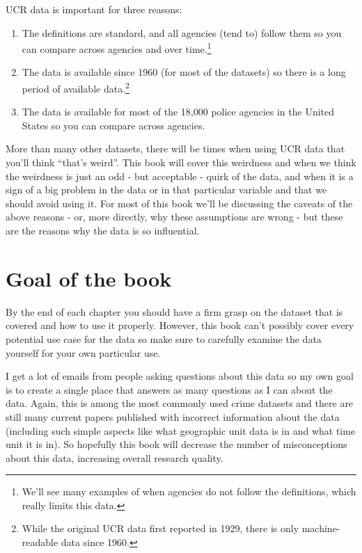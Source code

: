 \documentclass[
]{krantz}
\providecommand{\tightlist}{%
  \setlength{\itemsep}{0pt}\setlength{\parskip}{0pt}}
\begin{document}
UCR data is important for three reasons:

\begin{enumerate}
\def\labelenumi{\arabic{enumi}.}
\tightlist
\item
  The definitions are standard, and all agencies (tend to)
  follow them so you can compare across agencies and over
  time.\footnote{We'll see many examples of when agencies do
    not follow the definitions, which really limits this
    data.}
\item
  The data is available since 1960 (for most of the
  datasets) so there is a long period of available
  data.\footnote{While the original UCR data first reported
    in 1929, there is only machine-readable data since 1960.}
\item
  The data is available for most of the 18,000 police
  agencies in the United States so you can compare across
  agencies.
\end{enumerate}

More than many other datasets, there will be times when
using UCR data that you'll think ``that's weird''. This book
will cover this weirdness and when we think the weirdness is
just an odd - but acceptable - quirk of the data, and when
it is a sign of a big problem in the data or in that
particular variable and that we should avoid using it. For
most of this book we'll be discussing the caveats of the
above reasons - or, more directly, why these assumptions are
wrong - but these are the reasons why the data is so
influential.

\section{Goal of the book}\label{goal-of-the-book}

By the end of each chapter you should have a firm grasp on
the dataset that is covered and how to use it properly.
However, this book can't possibly cover every potential use
case for the data so make sure to carefully examine the data
yourself for your own particular use.

I get a lot of emails from people asking questions about
this data so my own goal is to create a single place that
answers as many questions as I can about the data. Again,
this is among the most commonly used crime datasets and
there are still many current papers published with incorrect
information about the data (including such simple aspects
like what geographic unit data is in and what time unit it
is in). So hopefully this book will decrease the number of
misconceptions about this data, increasing overall research
quality.
\end{document}
